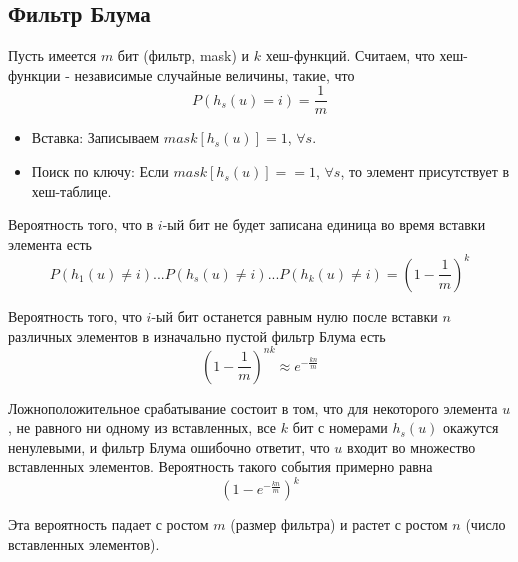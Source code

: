 \subsection {Фильтр Блума}
Пусть имеется $m$ бит (фильтр, mask) и $k$ хеш-функций. Считаем, что хеш-функции - независимые случайные величины, такие, что 
$$P(h_s(u) = i) = \frac{1}{m}$$

\begin{itemize}
\item Вставка: Записываем $mask[h_s(u)] = 1$, $\forall s$.
\item Поиск по ключу: Если $mask[h_s(u)] == 1$, $\forall s$, то элемент присутствует в хеш-таблице.
\end{itemize}

Вероятность того, что в $i$-ый бит не будет записана единица во время вставки элемента есть 
$$P(h_1(u) \ne i)...P(h_s(u) \ne i)...P(h_k(u) \ne i) = \left( 1 - \frac{1}{m}\right)^k$$

Вероятность того, что $i$-ый бит останется равным нулю после вставки $n$ различных элементов в изначально пустой фильтр Блума есть 
$$\left( 1 - \frac{1}{m}\right)^{nk} \approx e^{-\frac{kn}{m}}$$

Ложноположительное срабатывание состоит в том, что для некоторого элемента $u$, не равного ни одному из вставленных, все $k$ бит с номерами $h_s(u)$ окажутся ненулевыми, и фильтр Блума ошибочно ответит, что $u$ входит во множество вставленных элементов. Вероятность такого события примерно равна
$$(1 - e^{-\frac{kn}{m}})^k$$

Эта вероятность падает с ростом $m$ (размер фильтра) и растет с ростом $n$ (число вставленных элементов).
